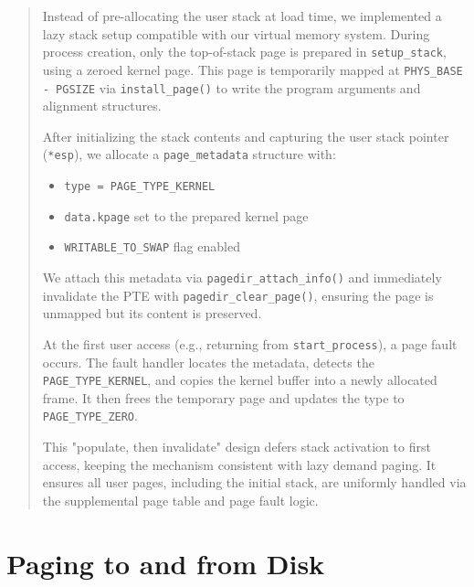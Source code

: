 \documentclass[a4paper,11pt]{paper}
\begin{document}
\begin{quote}
 Instead of pre-allocating the user stack at load time, we implemented a lazy stack setup compatible with our virtual memory system. During process creation, only the top-of-stack page is prepared in \texttt{setup\_stack}, using a zeroed kernel page. This page is temporarily mapped at \texttt{PHYS\_BASE - PGSIZE} via \texttt{install\_page()} to write the program arguments and alignment structures.

After initializing the stack contents and capturing the user stack pointer (\texttt{*esp}), we allocate a \texttt{page\_metadata} structure with:
\begin{itemize}
  \item \texttt{type = PAGE\_TYPE\_KERNEL}
  \item \texttt{data.kpage} set to the prepared kernel page
  \item \texttt{WRITABLE\_TO\_SWAP} flag enabled
\end{itemize}

We attach this metadata via \texttt{pagedir\_attach\_info()} and immediately invalidate the PTE with \texttt{pagedir\_clear\_page()}, ensuring the page is unmapped but its content is preserved.

At the first user access (e.g., returning from \texttt{start\_process}), a page fault occurs. The fault handler locates the metadata, detects the \texttt{PAGE\_TYPE\_KERNEL}, and copies the kernel buffer into a newly allocated frame. It then frees the temporary page and updates the type to \texttt{PAGE\_TYPE\_ZERO}.

This "populate, then invalidate" design defers stack activation to first access, keeping the mechanism consistent with lazy demand paging. It ensures all user pages, including the initial stack, are uniformly handled via the supplemental page table and page fault logic.

\end{quote}


\section{Paging to and from Disk}
\end{document}
